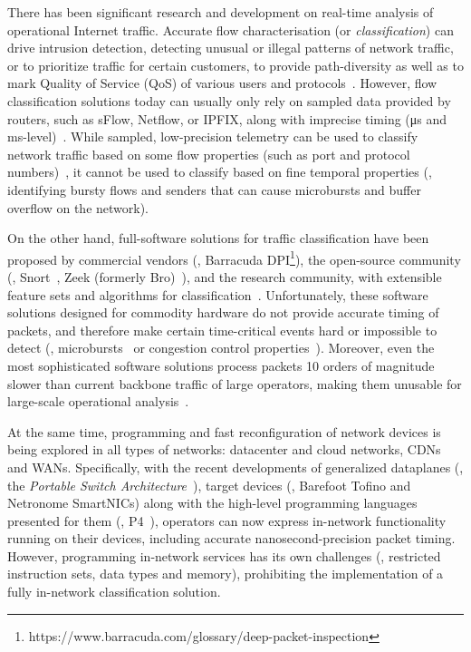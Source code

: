 
There has been significant research and development on real-time analysis of operational Internet traffic.
Accurate flow characterisation (or \emph{classification}) can drive intrusion detection, detecting unusual or illegal patterns of network traffic, or to prioritize traffic for certain customers, to provide path-diversity as well as to mark Quality of Service (QoS) of various users and protocols~\parencite{DBLP:journals/ccr/BernailleTASS06,DBLP:conf/lisa/Roesch99}.
However, flow classification solutions today can usually only rely on sampled data provided by routers, such as sFlow, Netflow, or IPFIX, along with imprecise timing (\si{\micro\second} and \si{\milli\second}-level)~\parencite{rfc7011,rfc3954}.
While sampled, low-precision telemetry can be used to classify network traffic based on some flow properties (such as port and protocol numbers)~\parencite{DBLP:conf/iwcmc/RossiV10}, it cannot be used to classify based on fine temporal properties (\eg, identifying bursty flows and senders that can cause microbursts and buffer overflow on the network).

On the other hand, full-software solutions for traffic classification have been proposed by commercial vendors (\eg, Barracuda DPI\footnote{https://www.barracuda.com/glossary/deep-packet-inspection}), the open-source community (\eg, Snort~\parencite{DBLP:conf/lisa/Roesch99}, Zeek (formerly Bro)~\parencite{DBLP:conf/uss/Paxson98,zeek}), and the research community, with extensible feature sets and algorithms for classification~\parencite{DBLP:conf/icccn/HagosEYK18}.
Unfortunately, these software solutions designed for commodity hardware do not provide accurate timing of packets, and therefore make certain time-critical events hard or impossible to detect (\eg, microbursts~\parencite{DBLP:conf/sigcomm/ChenFKRR18} or congestion control properties~\parencite{DBLP:conf/icccn/HagosEYK18}).
Moreover, even the most sophisticated software solutions process packets 10 orders of magnitude slower than current backbone traffic of large operators, making them unusable for large-scale operational analysis~\parencite{DBLP:journals/wpc/ParkA17}.

At the same time, programming and fast reconfiguration of network devices is being explored in all types of networks: datacenter and cloud networks, CDNs and WANs.
Specifically, with the recent developments of generalized dataplanes (\eg, the \emph{Portable Switch Architecture}~\parencite{p4-psa}), target devices (\eg, Barefoot Tofino and Netronome SmartNICs) along with the high-level programming languages presented for them (\eg, P4~\parencite{DBLP:journals/ccr/BosshartDGIMRSTVVW14}), operators can now express in-network functionality running on their devices, including accurate nanosecond-precision packet timing.
However, programming in-network services has its own challenges (\eg, restricted instruction sets, data types and memory), prohibiting the implementation of a fully in-network classification solution.

